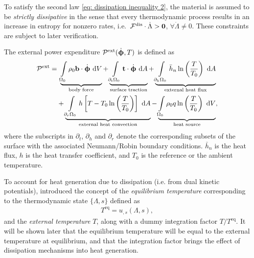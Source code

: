 To satisfy the second law \eqref{eq: dissipation inequality 2}, the material is assumed to be \emph{strictly dissipative} in the sense that every thermodynamic process results in an increase in entropy for nonzero rates, i.e.\ $\mathcal{F}^\text{dis}\cdot\dot{\Lambda} > \boldsymbol{0}$, $\forall \dot{\Lambda} \neq 0$. These constraints are subject to later verification.

The external power expenditure $\mathcal{P}^\text{ext}(\dot{\boldsymbol{\upphi}}, T)$ is defined as
\begin{equation}
  \begin{aligned}
    \mathcal{P}^\text{ext} = & \ \underbrace{\int\limits_{\Omega_0} \rho_0 \textbf{b} \cdot \dot{\boldsymbol{\upphi}} \text{ d}V}_\text{body force} + \underbrace{\int\limits_{\partial_t\Omega_0} \textbf{t} \cdot \dot{\boldsymbol{\upphi}} \text{ d}A}_\text{surface traction} + \underbrace{\int\limits_{\partial_h\Omega_0} \bar{h}_n\ln\left( \dfrac{T}{T_0} \right) \text{ d}A}_\text{external heat flux} \\
                             & + \underbrace{\int\limits_{\partial_r\Omega_0} h\left[ T - T_0 \ln\left( \dfrac{T}{T_0} \right) \right] \text{ d}A}_\text{external heat convection} - \underbrace{\int\limits_{\Omega_0} \rho_0 q \ln\left( \dfrac{T}{T_0} \right) \text{ d}V}_\text{heat source},                                                               
  \end{aligned}\label{eq: external power}
\end{equation}
where the subscripts in $\partial_t$, $\partial_h$ and $\partial_r$ denote the corresponding subsets of the surface with the associated Neumann/Robin boundary conditions. $\bar{h}_n$ is the heat flux, $h$ is the heat transfer coefficient, and $T_0$ is the reference or the ambient temperature.

To account for heat generation due to dissipation (i.e. from dual kinetic potentials), \citet{yang2006variational} introduced the concept of the \emph{equilibrium temperature} corresponding to the thermodynamic state $\{ \Lambda, s \}$ defined as
\begin{align}
  T^\text{eq} = u_{,s}(\Lambda, s),
\end{align}
and the \emph{external temperature} $T$, along with a dummy integration factor $T/T^\text{eq}$. It will be shown later that the equilibrium temperature will be equal to the external temperature at equilibrium, and that the integration factor brings the effect of dissipation mechanisms into heat generation.

